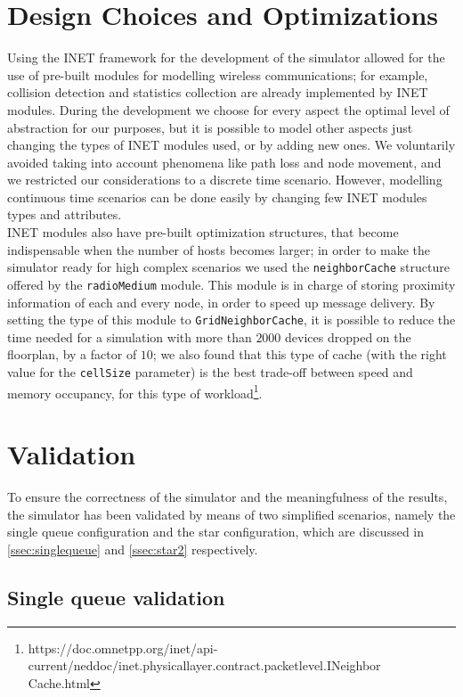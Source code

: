 \section{Design Choices and Optimizations}
Using the INET framework for the development of the simulator allowed for the use of pre-built modules for modelling wireless communications; for example,
collision detection and statistics collection are already implemented by INET
modules. During the development we choose for every aspect the optimal level of
abstraction for our purposes, but it is possible to model other aspects just 
changing the types of INET modules used, or by adding new ones. We voluntarily
avoided taking into account phenomena like path loss and node movement, and we 
restricted our considerations to a discrete time scenario. However, modelling
continuous time scenarios can be done easily by changing few INET modules types
and attributes.\\
INET modules also have pre-built optimization structures, that become
indispensable when the number of hosts becomes larger; in order to make the
simulator ready for high complex scenarios we used the \texttt{neighborCache}
structure offered by the \texttt{radioMedium} module. This module is in charge
of storing proximity information of each and every node, in order to speed up
message delivery. By setting the type of this module to \texttt{GridNeighborCache},
it is possible to reduce the time needed for a simulation with more than
$2000$ devices dropped on the floorplan, by a factor of $10$; we also found that
this type of cache (with the right value for the \texttt{cellSize} parameter) is
the best trade-off between speed and memory occupancy, for this type of
workload\footnote{https://doc.omnetpp.org/inet/api-current/neddoc/inet.physicallayer.contract.packetlevel.INeighbor\\
Cache.html}.  

\section{Validation}
To ensure the correctness of the simulator and the meaningfulness of the results, the simulator has been validated by means of two simplified scenarios, namely the single queue configuration and the star configuration, which are discussed in \ref{ssec:singlequeue} and \ref{ssec:star2} respectively.

\subsection{Single queue validation}

